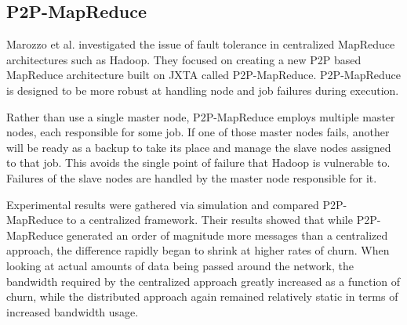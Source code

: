 \documentclass[10pt, conference, compsocconf]{IEEEtran}
\begin{document}






\subsection{P2P-MapReduce}
Marozzo et al. \cite{marozzo2012p2p} investigated the issue of fault tolerance in centralized MapReduce architectures such as Hadoop.  They focused on creating a new P2P based MapReduce architecture built on JXTA \cite{935182} called P2P-MapReduce.  P2P-MapReduce is designed to be more robust at handling node and job failures during execution.

Rather than use a single master node, P2P-MapReduce employs multiple master nodes, each responsible for some job.  If one of those master nodes fails, another will be ready as a backup to take its place and manage the slave nodes assigned to that job.  This avoids the single point of failure that Hadoop is vulnerable to. Failures of the slave nodes are handled by the master node responsible for it.

Experimental results were gathered via simulation and compared P2P-MapReduce to a centralized framework. Their results showed that while P2P-MapReduce generated an order of magnitude more messages than a centralized approach, the difference rapidly began to shrink at higher rates of churn.  When looking at actual amounts of data being passed around the network, the bandwidth required by the centralized approach greatly increased as a function of churn, while the distributed approach again remained relatively static in terms of increased bandwidth usage.  
\end{document}
